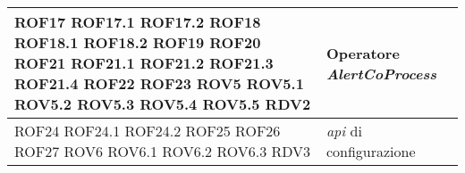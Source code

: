 {\begin{longtable}{L{5cm} L{8.5cm}}
ROF17 \newline ROF17.1 \newline ROF17.2 \newline ROF18 \newline ROF18.1 \newline ROF18.2 \newline ROF19 \newline ROF20 \newline ROF21 \newline ROF21.1 \newline ROF21.2 \newline ROF21.3 \newline ROF21.4 \newline ROF22 \newline ROF23 \newline ROV5 \newline ROV5.1 \newline ROV5.2 \newline ROV5.3 \newline ROV5.4 \newline ROV5.5 \newline RDV2 & Operatore \textit{AlertCoProcess} \\
\hline
ROF24 \newline ROF24.1 \newline ROF24.2 \newline ROF25 \newline ROF26 \newline ROF27 \newline ROV6 \newline ROV6.1 \newline ROV6.2 \newline ROV6.3 \newline RDV3 & \textit{\gls{api}} di configurazione \\
\hline
\end{longtable}
}
